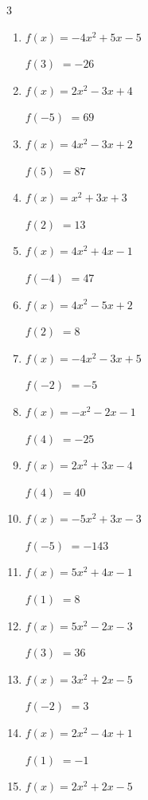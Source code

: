 \begin{multicols}{3}
\begin{enumerate}
$f(3)$
        $= 22$

\columnbreak %

  \item $f(x)=-4x^{2}+5x-5$

$f(3)$
        $= -26$

  \item $f(x)=2x^{2}-3x+4$

$f(-5)$
        $= 69$

  \item $f(x)=4x^{2}-3x+2$

$f(5)$
        $= 87$

  \item $f(x)=x^{2}+3x+3$

$f(2)$
        $= 13$

  \item $f(x)=4x^{2}+4x-1$

$f(-4)$
        $= 47$

  \item $f(x)=4x^{2}-5x+2$

$f(2)$
        $= 8$

  \item $f(x)=-4x^{2}-3x+5$

$f(-2)$
        $= -5$

  \item $f(x)=-x^{2}-2x-1$

$f(4)$
        $= -25$

  \item $f(x)=2x^{2}+3x-4$

$f(4)$
        $= 40$

  \item $f(x)=-5x^{2}+3x-3$

$f(-5)$
        $= -143$

  \item $f(x)=5x^{2}+4x-1$

$f(1)$
        $= 8$

  \item $f(x)=5x^{2}-2x-3$

$f(3)$
        $= 36$

  \item $f(x)=3x^{2}+2x-5$

$f(-2)$
        $= 3$

  \item $f(x)=2x^{2}-4x+1$

$f(1)$
        $= -1$

  \item $f(x)=2x^{2}+2x-5$


\end{enumerate}
\end{multicols}
